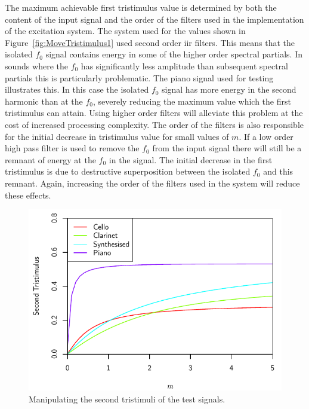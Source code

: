 		The maximum achievable first tristimulus value is determined by both the content of the input signal and
		the order of the filters used in the implementation of the excitation system. The system used for the
		values shown in Figure~\ref{fig:MoveTristimulus1} used second order \acrshort{iir} filters. This means that
		the isolated $f_{0}$ signal contains energy in some of the higher order spectral partials. In sounds where
		the $f_{0}$ has significantly less amplitude than subsequent spectral partials this is particularly
		problematic. The piano signal used for testing illustrates this. In this case the isolated $f_{0}$ signal
		has more energy in the second harmonic than at the $f_{0}$, severely reducing the maximum value which the
		first tristimulus can attain. Using higher order filters will alleviate this problem at the cost of
		increased processing complexity. The order of the filters is also responsible for the initial decrease in
		tristimulus value for small values of $m$. If a low order high pass filter is used to remove the $f_{0}$
		from the input signal there will still be a remnant of energy at the $f_{0}$ in the signal. The initial
		decrease in the first tristimulus is due to destructive superposition between the isolated $f_{0}$ and this
		remnant. Again, increasing the order of the filters used in the system will reduce these effects.

		\begin{figure}[h!]
			\centering
			\includegraphics{chapter6/Images/MoveTristimulus2.pdf}
			\caption{Manipulating the second tristimuli of the test signals.}
			\label{fig:MoveTristimulus2}
		\end{figure}

